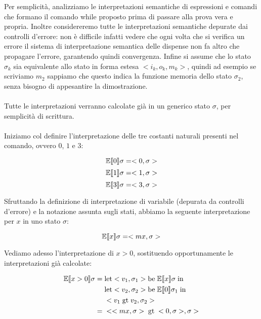     Per semplicità, analizziamo le interpretazioni semantiche di espressioni e comandi che formano il comando while proposto prima di passare alla prova vera e propria. Inoltre considereremo tutte le interpretazioni semantiche depurate dai controlli d'errore: non è difficile infatti vedere che ogni volta che si verifica un errore il sistema di interpretazione semantica delle dispense non fa altro che propagare l'errore, garantendo quindi convergenza. Infine si assume che lo stato $\sigma_k$ sia equivalente allo stato in forma estesa $<i_k, o_k, m_k>$, quindi ad esempio se scriviamo $m_2$ sappiamo che questo indica la funzione memoria dello stato $\sigma_2$, senza bisogno di appesantire la dimostrazione.\\
    \\
    Tutte le interpretazioni verranno calcolate già in un generico stato $\sigma$, per semplicità di scrittura.\\
    \\
    Iniziamo col definire l'interpretazione delle tre costanti naturali presenti nel comando, ovvero $0$, $1$ e $3$:
    
    \begin{equation*}
        \mathbb{E}\llbracket 0 \rrbracket\sigma = <0, \sigma>
    \end{equation*}
    \begin{equation*}
        \mathbb{E}\llbracket 1 \rrbracket\sigma = <1, \sigma>
    \end{equation*}
    \begin{equation*}
        \mathbb{E}\llbracket 3 \rrbracket\sigma = <3, \sigma>
    \end{equation*}
    
    Sfruttando la definizione di interpretazione di variabile (depurata da controlli d'errore) e la notazione assunta sugli stati, abbiamo la seguente interpretazione per $x$ in uno stato $\sigma$:
    
    \begin{equation*}
        \mathbb{E}\llbracket x \rrbracket\sigma = <mx, \sigma>
    \end{equation*}
    
    Vediamo adesso l'interpretazione di $x>0$, sostituendo opportunamente le interpretazioni già calcolate:
    
    \begin{align*}
        \mathbb{E}\llbracket x>0 \rrbracket\sigma =\;& \mbox{let} <v_1,\sigma_1> \mbox{be}\; \mathbb{E}\llbracket x \rrbracket\sigma\; \mbox{in}\;\\
        &\mbox{let} <v_2,\sigma_2> \mbox{be}\; \mathbb{E}\llbracket 0 \rrbracket\sigma_1\; \mbox{in}\;\\
        &<v_1\; \mbox{gt}\; v_2, \sigma_2>\\
        =\;& <<mx,\sigma>\; \mbox{gt}\; <0, \sigma>, \sigma>
    \end{align*}
    
